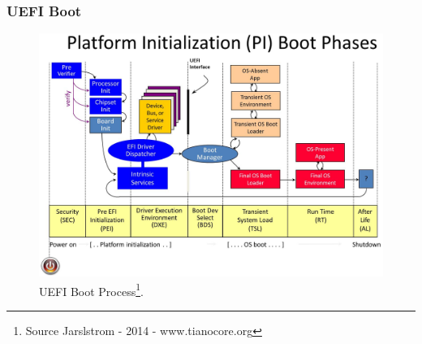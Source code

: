 \documentclass[aspectratio=169, xcolor=table, notheorems, hyperref={pdfpagelabels=false}]{beamer}
\begin{document}
\begin{frame}
\frametitle{UEFI Boot}
\begin{figure}
\includegraphics[width=0.51\linewidth]{os03-Jarlstrom-2014-PI-Boot-Phases-tianocore-org}
\caption{UEFI Boot Process\footnote{
Source Jarslstrom - 2014 - www.tianocore.org}.}
\end{figure}
\end{frame}

\end{document}

